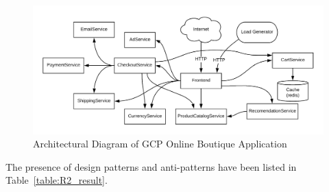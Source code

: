 \documentclass{Configuration_Files/PoliMi3i_thesis}
\begin{document}
\begin{figure}[H]
\centering
\includegraphics[width=1\textwidth]{myImages/R2.png}
\caption{Architectural Diagram of GCP Online Boutique Application}
\label{fig:R2_arch}
\end{figure}

The presence of design patterns and anti-patterns have been listed in Table~\ref{table:R2_result}.
\end{document}
